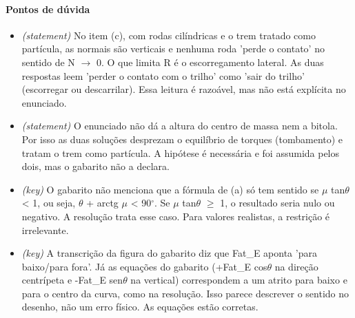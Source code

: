 \documentclass{article}%
\begin{document}
\paragraph{Pontos de dúvida}%
\begin{itemize}%
\item%
\textit{(statement)} No item (c), com rodas cilíndricas e o trem tratado como partícula, as normais são verticais e nenhuma roda 'perde o contato' no sentido de N $\to$ 0. O que limita R é o escorregamento lateral. As duas respostas leem 'perder o contato com o trilho' como 'sair do trilho' (escorregar ou descarrilar). Essa leitura é razoável, mas não está explícita no enunciado.%
\item%
\textit{(statement)} O enunciado não dá a altura do centro de massa nem a bitola. Por isso as duas soluções desprezam o equilíbrio de torques (tombamento) e tratam o trem como partícula. A hipótese é necessária e foi assumida pelos dois, mas o gabarito não a declara.%
\item%
\textit{(key)} O gabarito não menciona que a fórmula de (a) só tem sentido se $\mu$ tan$\theta$ < 1, ou seja, $\theta$ + arctg $\mu$ < 90$^\circ$. Se $\mu$ tan$\theta$ $\geq$ 1, o resultado seria nulo ou negativo. A resolução trata esse caso. Para valores realistas, a restrição é irrelevante.%
\item%
\textit{(key)} A transcrição da figura do gabarito diz que Fat\_E aponta 'para baixo/para fora'. Já as equações do gabarito (+Fat\_E cos$\theta$ na direção centrípeta e -Fat\_E sen$\theta$ na vertical) correspondem a um atrito para baixo e para o centro da curva, como na resolução. Isso parece descrever o sentido no desenho, não um erro físico. As equações estão corretas.%
\end{itemize}%
\end{document}
